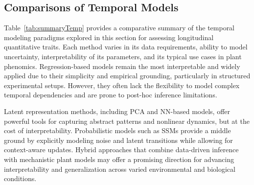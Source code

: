 \documentclass{article}
\begin{document}
\subsection{Comparisons of Temporal Models}

Table~\ref{tab:summaryTemp} provides a comparative summary of the temporal modeling paradigms explored in this section for assessing longitudinal quantitative traits. Each method varies in its data requirements, ability to model uncertainty, interpretability of its parameters, and its typical use cases in plant phenomics. Regression-based models remain the most interpretable and widely applied due to their simplicity and empirical grounding, particularly in structured experimental setups. However, they often lack the flexibility to model complex temporal dependencies and are prone to post-hoc inference limitations.

Latent representation methods, including PCA and NN-based models, offer powerful tools for capturing abstract patterns and nonlinear dynamics, but at the cost of interpretability. Probabilistic models such as SSMs provide a middle ground by explicitly modeling noise and latent transitions while allowing for context-aware updates. Hybrid approaches that combine data-driven inference with mechanistic plant models may offer a promising direction for advancing interpretability and generalization across varied environmental and biological conditions.
\end{document}
